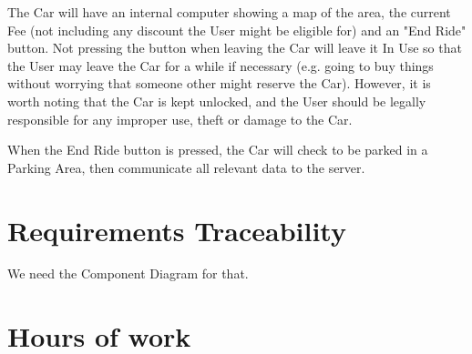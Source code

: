 \documentclass[12pt]{article}
\begin{document}
The Car will have an internal computer showing a map of the area, the current Fee (not including any discount the User might be eligible for) and an "End Ride" button. Not pressing the button when leaving the Car will leave it In Use so that the User may leave the Car for a while if necessary (e.g. going to buy things without worrying that someone other might reserve the Car). However, it is worth noting that the Car is kept unlocked, and the User should be legally responsible for any improper use, theft or damage to the Car.

When the End Ride button is pressed, the Car will check to be parked in a Parking Area, then communicate all relevant data to the server.

\clearpage
\section{Requirements Traceability}
We need the Component Diagram for that.
\clearpage
\section{Hours of work}
\end{document}
